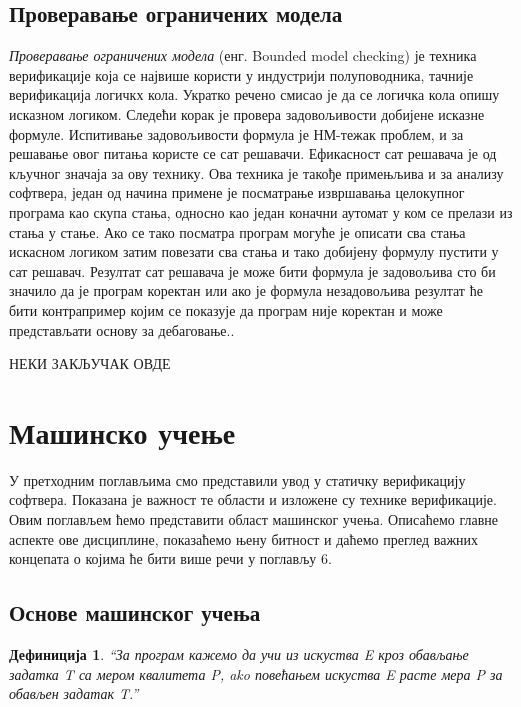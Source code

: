 \documentclass[a4paper]{article}
\newtheorem{definic}{Дефиниција}
\begin{document}
{\subsection{Проверавање ограничених модела}
\textit{Проверавање ограничених модела} (енг. Bounded model checking) је техника верификације која се највише користи у индустрији полуповодника, тачније верификација логичкх кола. Укратко речено смисао је да се логичка кола опишу исказном логиком. Следећи корак је провера задовољивости добијене исказне формуле. Испитивање задовољивости формула је НМ-тежак проблем, и за решавање овог питања користе се сат решавачи. Ефикасност сат решавача је од кључног значаја за ову технику. Ова техника је такође примењљива и за анализу софтвера, један од начина примене је посматрање извршавања целокупног програма као скупа стања, односно као један коначни аутомат у ком се прелази из стања у стање. Ако се тако посматра програм могуће је описати сва стања искасном логиком затим повезати сва стања и тако добијену формулу пустити у сат решавач. Резултат сат решавача је може бити формула је задовољива сто би значило да је програм коректан или ако је формула незадовољива резултат ће бити контрапример којим се показује да програм није коректан и може представљати основу за дебаговање.\cite{survey}\cite{dkw2008}.


\color{blue}
НЕКИ ЗАКЉУЧАК ОВДЕ
\color{black}
\section{Машинско учење}
У претходним поглављима смо представили увод у статичку верификацију софтвера. Показана је важност те области и изложене су технике верификације. Овим поглављем ћемо представити област машинског учења. Описаћемо главне аспекте ове дисциплине, показаћемо њену битност и даћемо преглед важних концепата о којима ће бити више речи у поглављу 6.

\subsection{Основе машинског учења}
\begin{definic}
``За програм кажемо да учи из искуства E кроз обављање задатка T са мером квалитета P, ako повећањем искуства E расте мера P за обављен задатак T.''
\\[5pt]
\end{definic}


}
\end{document}
